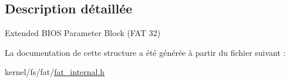 \subsection{Description détaillée}
Extended B\-I\-O\-S Parameter Block (F\-A\-T 32) 

La documentation de cette structure a été générée à partir du fichier suivant \-:\begin{DoxyCompactItemize}
\item 
kernel/fs/fat/\hyperlink{fat__internal_8h}{fat\-\_\-internal.\-h}\end{DoxyCompactItemize}
